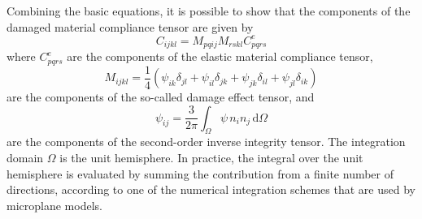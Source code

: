\documentclass[a4paper]{article}
\newcommand{\dO}{\,\mbox{d}\Omega}
\newcommand{\quarter}{\mbox{$\frac{1}{4}$}}
\begin{document}
Combining the basic equations, it is possible to show that the
components of the damaged
material compliance tensor are given by
\begin{equation}
\label{damcom}
C_{ijkl}=M_{pqij}M_{rskl}C^e_{pqrs}
\end{equation}
where $C^e_{pqrs}$ are the components of the elastic material compliance tensor,
\begin{equation}
\label{ee27}
M_{ijkl} = \quarter\left(
\psi_{ik}\delta_{jl}+\psi_{il}\delta_{jk}+\psi_{jk}\delta_{il}+\psi_{jl}\delta_{ik}\right)
\end{equation}
are the components of the so-called damage effect tensor, and
\begin{equation}
\label{ee24}
\psi_{ij} = \frac{3}{2\pi}\int_\Omega \psi\, n_i n_j \dO
\end{equation}
are the components of the second-order inverse integrity tensor.
The integration domain $\Omega$ is the unit hemisphere.
In practice, the integral over the unit hemisphere is evaluated by
summing the contribution from a finite number of directions, according
to one of the numerical integration schemes that are used by microplane
models.
\end{document}
